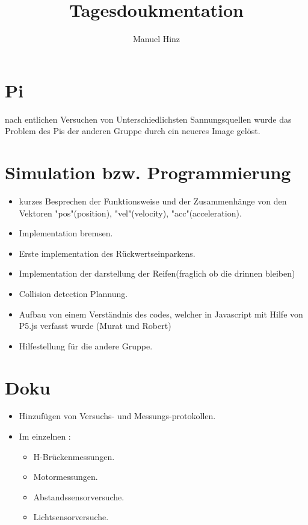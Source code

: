 \documentclass{article}
\author{Manuel Hinz}
\title{Tagesdoukmentation}
\begin{document}
\maketitle

\section{Pi}

nach entlichen Versuchen von Unterschiedlichsten Sannungsquellen wurde das Problem des Pis der anderen Gruppe durch ein neueres Image gel\"{o}st.

\section{Simulation bzw. Programmierung}

\begin{itemize}

\item kurzes Besprechen der Funktionsweise und der Zusammenh\"{a}nge von den Vektoren "pos"(position), "vel"(velocity), "acc"(acceleration).

\item Implementation bremsen.

\item Erste implementation des R\"{u}ckwertseinparkens.

\item Implementation der darstellung der Reifen(fraglich ob die drinnen bleiben)

\item Collision detection Plannung.

\item Aufbau von einem Verst\"{a}ndnis des codes, welcher in  Javascript mit Hilfe von P5.js verfasst wurde (Murat und Robert)

\item Hilfestellung f\"{u}r die andere Gruppe.

\end{itemize}

\section{Doku}

\begin{itemize}

\item Hinzuf\"{u}gen von Versuchs- und Messungs-protokollen.

\item Im einzelnen : 
\begin{itemize}

\item H-Br\"{u}ckenmessungen.

\item Motormessungen.

\item Abstandssensorversuche.

\item Lichtsensorversuche.

\end{itemize}

\end{itemize}
\end{document}
